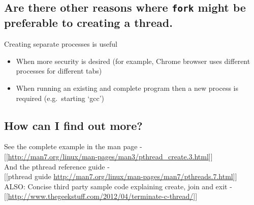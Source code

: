 \subsection{\texorpdfstring{Are there other reasons where \texttt{fork}
might be preferable to creating a
thread.}{Are there other reasons where fork might be preferable to creating a thread.}}\label{are-there-other-reasons-where-fork-might-be-preferable-to-creating-a-thread.}

Creating separate processes is useful

\begin{itemize}
\itemsep1pt\parskip0pt
\item
  When more security is desired (for example, Chrome browser uses
  different processes for different tabs)
\item
  When running an existing and complete program then a new process is
  required (e.g.~starting `gcc')
\end{itemize}

\subsection{How can I find out more?}\label{how-can-i-find-out-more}

See the complete example in the man page
-\\{[}{[}\url{http://man7.org/linux/man-pages/man3/pthread_create.3.html}{]}{]}\\And
the pthread reference guide -\\{[}{[}pthread guide\textbar{}
\url{http://man7.org/linux/man-pages/man7/pthreads.7.html}{]}{]}\\ALSO:
Concise third party sample code explaining create, join and exit
-\\{[}{[}\url{http://www.thegeekstuff.com/2012/04/terminate-c-thread/}{]}{]}

